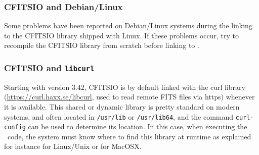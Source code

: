 \documentclass[12pt,twoside]{article}
\begin{document}
\subsubsection*{CFITSIO and Debian/Linux}
%
Some problems have been reported on Debian/Linux systems during the
linking to the CFITSIO library shipped with Linux. If these problems
occur, try to recompile the CFITSIO library from scratch before linking
to \healpixns.

\subsubsection*{CFITSIO and \texttt{libcurl}}
\label{install:curl}
%
Starting with version 3.42, CFITSIO is by default linked with the 
curl library (\url{https://curl.haxx.se/libcurl},
used to read remote FITS files via https) whenever it is available.
This shared or dynamic library is pretty standard on modern systems, 
and often located in \texttt{/usr/lib} or \texttt{/usr/lib64}, and the command \texttt{curl-config} 
can be used to determine its location.
In this case, when executing the \healpix\ code, 
the system must know where to find this library at runtime as explained for instance 
for Linux/Unix or 
 for MacOSX.
\end{document}
